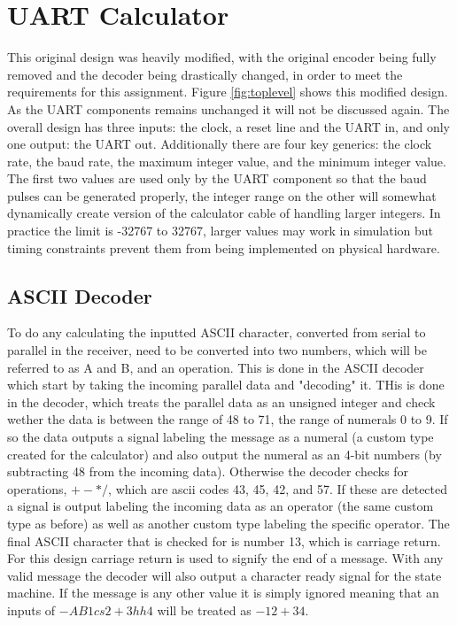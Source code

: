 \documentclass[11pt]{article}
\begin{document}
\section{UART Calculator}
This original design was heavily modified, with the original encoder being fully removed and the decoder being drastically changed, in order to meet the requirements for this assignment.
Figure \ref{fig:toplevel} shows this modified design.
As the UART components remains unchanged it will not be discussed again.
The overall design has three inputs: the clock, a reset line and the UART in, and only one output: the UART out.
Additionally there are four key generics: the clock rate, the baud rate, the maximum integer value, and the minimum integer value.
The first two values are used only by the UART component so that the baud pulses can be generated properly,
the integer range on the other will somewhat dynamically create version of the calculator cable of handling larger integers.
In practice the limit is -32767 to 32767, larger values may work in simulation but timing constraints prevent them from being implemented on physical hardware.


\subsection{ASCII Decoder}

To do any calculating the inputted ASCII character, converted from serial to parallel in the receiver, need to be converted into two numbers, which will be referred to as A and B, and an operation.
This is done in the ASCII decoder which start by taking the incoming parallel data and "decoding" it.
THis is done in the decoder, which treats the parallel data as an unsigned integer and check wether the data is between the range of 48 to 71, the range of numerals 0 to 9.
If so the data outputs a signal labeling the message as a numeral (a custom type created for the calculator) and also output the numeral as an 4-bit numbers (by subtracting 48 from the incoming data).
Otherwise the decoder checks for operations, $+-*/$, which are ascii codes 43, 45, 42, and 57.
If these are detected a signal is output labeling the incoming data as an operator (the same custom type as before) as well as another custom type labeling the specific operator.
The final ASCII character that is checked for is number 13, which is carriage return.
For this design carriage return is used to signify the end of a message.
With any valid message the decoder will also output a character ready signal for the state machine.
If the message is any other value it is simply ignored meaning that an inputs of $-AB1cs 2 + 3 hh4$ will be treated as $-12+34$.
\end{document}

